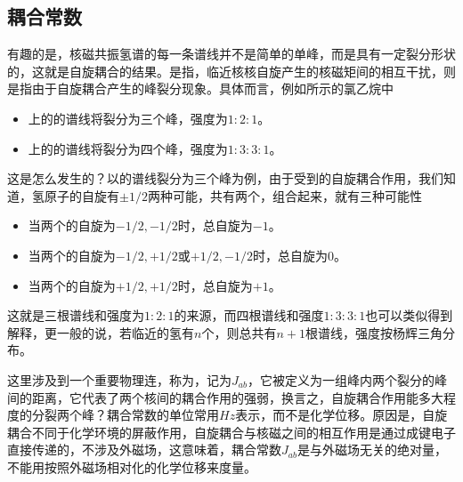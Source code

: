 \subsection{耦合常数}
有趣的是，核磁共振氢谱的每一条谱线并不是简单的单峰，而是具有一定裂分形状的，这就是自旋耦合的结果。是指，临近核核自旋产生的核磁矩间的相互干扰，则是指由于自旋耦合产生的峰裂分现象。具体而言，例如所示的氯乙烷中
\begin{itemize}
    \item {}上的的谱线将裂分为三个峰，强度为$1:2:1$。
    \item {}上的的谱线将裂分为四个峰，强度为$1:3:3:1$。
\end{itemize}\goodbreak
这是怎么发生的？以的谱线裂分为三个峰为例，由于受到的自旋耦合作用，我们知道，氢原子的自旋有$\pm 1/2$两种可能，共有两个，组合起来，就有三种可能性
\begin{itemize}
    \item 当两个的自旋为$-1/2,-1/2$时，总自旋为$-1$。
    \item 当两个的自旋为$-1/2,+1/2$或$+1/2,-1/2$时，总自旋为$0$。
    \item 当两个的自旋为$+1/2,+1/2$时，总自旋为$+1$。
\end{itemize}
这就是三根谱线和强度为$1:2:1$的来源，而四根谱线和强度$1:3:3:1$也可以类似得到解释，更一般的说，若临近的氢有$n$个，则总共有$n+1$根谱线，强度按杨辉三角分布。

\begin{Figure}[自旋裂分的示例]
    \begin{FigureSub}[氯乙烷]
    \end{FigureSub}
    \qquad
    \begin{FigureSub}[二氟乙烯]
    \end{FigureSub}
    \qquad
    \begin{FigureSub}[氟乙烯]
    \end{FigureSub}
\end{Figure}
这里涉及到一个重要物理连，称为，记为$J_{ab}$，它被定义为一组峰内两个裂分的峰间的距离，它代表了两个核间的耦合作用的强弱，换言之，自旋耦合作用能多大程度的分裂两个峰？耦合常数的单位常用$\si{Hz}$表示，而不是化学位移。原因是，自旋耦合不同于化学环境的屏蔽作用，自旋耦合与核磁之间的相互作用是通过成键电子直接传递的，不涉及外磁场，这意味着，耦合常数$J_{ab}$是与外磁场无关的绝对量，不能用按照外磁场相对化的化学位移来度量。

